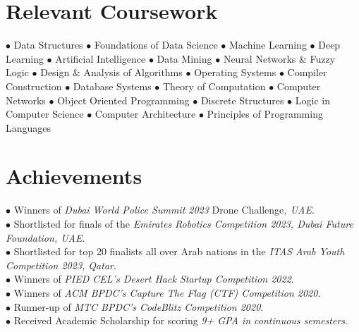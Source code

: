 \documentclass[a4paper,11pt]{article}
\begin{document}
\vspace{-2.5mm}

\section{Relevant Coursework}

\small{

{$\bullet$ Data Structures $\bullet$ Foundations of Data Science $\bullet$ Machine Learning $\bullet$ Deep Learning $\bullet$ Artificial Intelligence $\bullet$ Data Mining $\bullet$ Neural Networks \& Fuzzy Logic $\bullet$ Design \& Analysis of Algorithms $\bullet$ Operating Systems  $\bullet$ Compiler Construction $\bullet$ Database Systems $\bullet$ Theory of Computation $\bullet$ Computer Networks $\bullet$ Object Oriented Programming $\bullet$ Discrete Structures $\bullet$ Logic in Computer Science $\bullet$ Computer Architecture $\bullet$ Principles of Programming Languages }\\

}

\vspace{-2.5mm}

\section{Achievements}

\vspace{1mm}

\small{
    {$\bullet$ Winners of \textit{Dubai World Police Summit 2023} Drone Challenge\textit{, UAE}.}\\
    \vspace{0.5mm}
    {$\bullet$ Shortlisted for finals of the\textit{ Emirates Robotics Competition 2023, Dubai Future Foundation, UAE}.}\\
    \vspace{0.5mm}
    {$\bullet$ Shortlisted for top 20 finalists all over Arab nations in the\textit{ ITAS Arab Youth Competition 2023, Qatar}.}\\
    \vspace{0.5mm}
    {$\bullet$ Winners of \textit{PIED CEL's Desert Hack Startup Competition    2022}.}\\
    \vspace{0.5mm}
    {$\bullet$ Winners of \textit{ACM BPDC’s Capture The Flag (CTF) Competition 2020}.}\\
    \vspace{0.5mm}
    {$\bullet$ Runner-up of \textit{MTC BPDC’s CodeBlitz Competition 2020}.}\\
    \vspace{0.5mm}
    {$\bullet$ Received Academic Scholarship for scoring \textit{9+ GPA in continuous semesters}.}\\
} 
\end{document}
